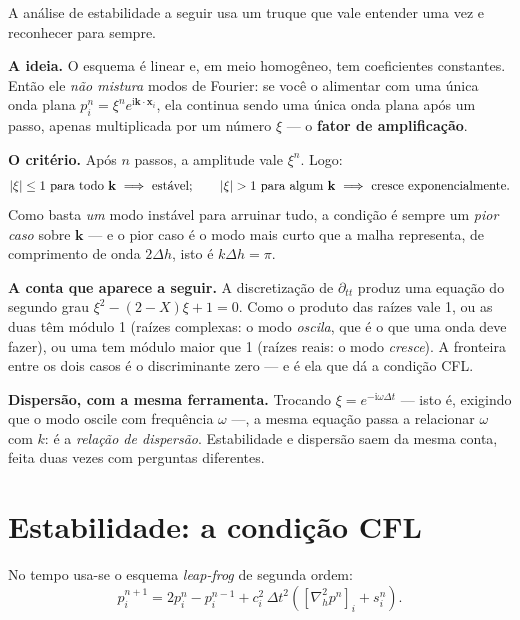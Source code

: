 \documentclass[11pt,a4paper,oneside]{report}
\begin{document}
\begin{matematica}
A an\'alise de estabilidade a seguir usa um truque que vale entender uma vez e
reconhecer para sempre.

\textbf{A ideia.} O esquema \'e linear e, em meio homog\^eneo, tem
coeficientes constantes. Ent\~ao ele \emph{n\~ao mistura} modos de Fourier: se
voc\^e o alimentar com uma \'unica onda plana
$p_i^{n} = \xi^{n}e^{\mathrm{i}\mathbf{k}\cdot\mathbf{x}_i}$, ela continua
sendo uma \'unica onda plana ap\'os um passo, apenas multiplicada por um
n\'umero $\xi$ --- o \textbf{fator de amplifica\c{c}\~ao}.

\textbf{O crit\'erio.} Ap\'os $n$ passos, a amplitude vale $\xi^{n}$. Logo:
\[
\lvert \xi \rvert \le 1 \ \text{para todo } \mathbf{k}
\ \Longrightarrow\ \text{est\'avel};
\qquad
\lvert \xi \rvert > 1 \ \text{para algum } \mathbf{k}
\ \Longrightarrow\ \text{cresce exponencialmente}.
\]
Como basta \emph{um} modo inst\'avel para arruinar tudo, a condi\c{c}\~ao \'e
sempre um \emph{pior caso} sobre $\mathbf{k}$ --- e o pior caso \'e o modo
mais curto que a malha representa, de comprimento de onda $2\Delta h$, isto
\'e $k\Delta h = \pi$.

\textbf{A conta que aparece a seguir.} A discretiza\c{c}\~ao de
$\partial_{tt}$ produz uma equa\c{c}\~ao do segundo grau
$\xi^{2}-(2-X)\xi+1=0$. Como o produto das ra\'izes vale 1, ou as duas t\^em
m\'odulo 1 (ra\'izes complexas: o modo \emph{oscila}, que \'e o que uma onda
deve fazer), ou uma tem m\'odulo maior que 1 (ra\'izes reais: o modo
\emph{cresce}). A fronteira entre os dois casos \'e o discriminante zero --- e
\'e ela que d\'a a condi\c{c}\~ao CFL.

\textbf{Dispers\~ao, com a mesma ferramenta.} Trocando
$\xi = e^{-\mathrm{i}\omega\Delta t}$ --- isto \'e, exigindo que o modo oscile
com frequ\^encia $\omega$ ---, a mesma equa\c{c}\~ao passa a relacionar
$\omega$ com $k$: \'e a \emph{rela\c{c}\~ao de dispers\~ao}. Estabilidade e
dispers\~ao saem da mesma conta, feita duas vezes com perguntas diferentes.
\end{matematica}

\section{Estabilidade: a condi\c{c}\~ao CFL}

No tempo usa-se o esquema \emph{leap-frog} de segunda ordem:
\begin{equation}
p_i^{n+1} = 2p_i^{n} - p_i^{n-1}
 + c_i^{2}\,\Delta t^{2}\left(\left[\nabla^{2}_{h} p^{n}\right]_i
 + s_i^{n}\right).
\label{eq:leapfrog}
\end{equation}
\end{document}
